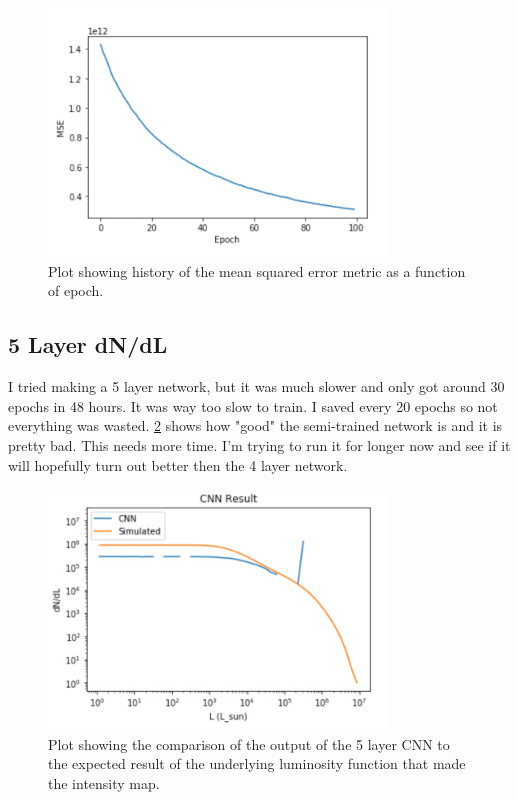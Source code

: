 \documentclass{article}
\begin{document}
			\begin{figure}[H]
				\centering
				\includegraphics[width=0.8\textwidth]{CNN_4_layer_history_mse.pdf}
				\caption{Plot showing history of the mean squared error metric as a function of epoch.}
				\label{fig:CNN_4_layer_history_mse}
			\end{figure}

		\subsection{5 Layer dN/dL} \label{sec:5directValue}
			I tried making a 5 layer network, but it was much slower and only got around 30 epochs in 48 hours.  It was way too slow to train.  I saved every 20 epochs so not everything was wasted.  \cref{fig:CNN_5_layer} shows how "good" the semi-trained network is and it is pretty bad.  This needs more time.  I'm trying to run it for longer now and see if it will hopefully turn out better then the 4 layer network.

			\begin{figure}[H]
				\centering
				\includegraphics[width=0.8\textwidth]{CNN_5_layer.pdf}
				\caption{Plot showing the comparison of the output of the 5 layer CNN to the expected result of the underlying luminosity function that made the intensity map.}
				\label{fig:CNN_5_layer}
			\end{figure}
\end{document}
